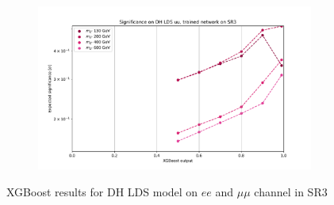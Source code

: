 \documentclass[12pt, a4paper]{book}
\begin{document}
\begin{figure}[!ht]
\begin{subfigure}[b]{0.49\textwidth}
   \end{subfigure}
   \hfill
   \begin{subfigure}[b]{0.49\textwidth}
      \centering
      \includegraphics[width=1\textwidth]{XGBoost/Model_independent/150/DH_LDS/EXP_SIG_uu.pdf}
   \end{subfigure}
   \caption{XGBoost results for DH LDS model on $ee$ and $\mu\mu$ channel in SR3}\label{fig:DH_LDS_SR3}
\end{figure}
\end{document}
